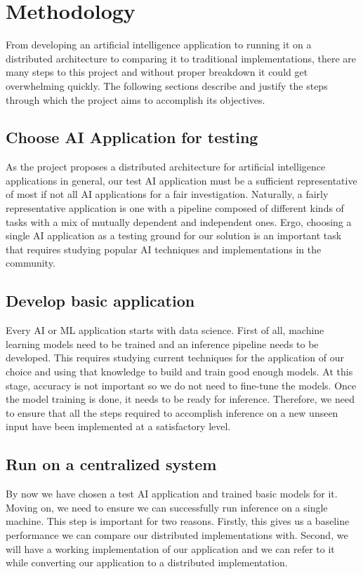 \documentclass{report}
\begin{document}
\chapter{Methodology}\label{chap:methodology}

From developing an artificial intelligence application to running it on a distributed architecture to comparing it to traditional implementations, there are many steps to this project and without proper breakdown it could get overwhelming quickly.
The following sections describe and justify the steps through which the project aims to accomplish its objectives.

\section{Choose AI Application for testing}
As the project proposes a distributed architecture for artificial intelligence applications in general, our test AI application must be a sufficient representative of most if not all AI applications for a fair investigation. Naturally, a fairly representative application is one with a pipeline composed of different kinds of tasks with a mix of mutually dependent and independent ones. Ergo, choosing a single AI application as a testing ground for our solution is an important task that requires studying popular AI techniques and implementations in the community.

\section{Develop basic application}
Every AI or ML application starts with data science.
First of all, machine learning models need to be trained and an inference pipeline needs to be developed.
This requires studying current techniques for the application of our choice and using that knowledge to build and train good enough models.
At this stage, accuracy is not important so we do not need to fine-tune the models.
Once the model training is done, it needs to be ready for inference.
Therefore, we need to ensure that all the steps required to accomplish inference on a new unseen input have been implemented at a satisfactory level.

\section{Run on a centralized system}
By now we have chosen a test AI application and trained basic models for it. Moving on, we need to ensure we can successfully run inference on a single machine. This step is important for two reasons. Firstly, this gives us a baseline performance we can compare our distributed implementations with. Second, we will have a working implementation of our application and we can refer to it while converting our application to a distributed implementation.
\end{document}
